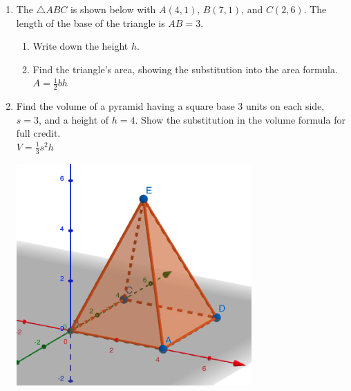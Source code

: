 \begin{enumerate}
\item The $\triangle ABC$ is shown below with $A(4,1)$, $B(7,1)$, and $C(2,6)$. The length of the base of the triangle is $AB=3$.
  \begin{multicols}{2}
    \begin{enumerate}
      \item Write down the height $h$.
      \item Find the triangle's area, showing the substitution into the area formula.\\[0.25cm]
      $A=\frac{1}{2}bh$ \vspace{2cm}
      \end{enumerate}
      \begin{flushright}
      \end{flushright}
  \end{multicols}

\item Find the volume of a pyramid having a square base 3 units on each side, $s=3$, and a height of $h=4$. Show the substitution in the volume formula for full credit. \\[0.5cm]
$\displaystyle V = \frac{1}{3} s^2 h$
  \begin{flushright}
    \includegraphics[width=9cm]{../graphics/04pyramid.png}
  \end{flushright}
  

\end{enumerate}
